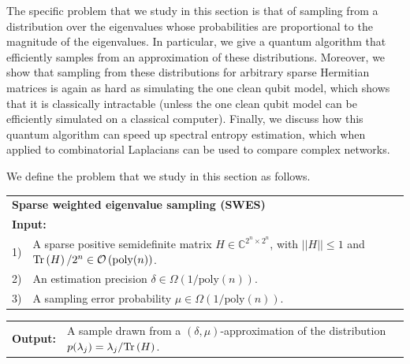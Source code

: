\documentclass[a4paper, onecolumn, accepted=2022-08-28]{quantumarticle}
\newcommand{\bigO}[1]{\mathcal{O}\left( #1 \right)}
\newcommand{\Tr}{\mbox{\rm Tr}}
\newcommand{\tr}[1]{\Tr\left(#1\right)}
\begin{document}
The specific problem that we study in this section is that of sampling from a distribution over the eigenvalues whose probabilities are proportional to the magnitude of the eigenvalues.
In particular, we give a quantum algorithm that efficiently samples from an approximation of these distributions.
Moreover, we show that sampling from these distributions for arbitrary sparse Hermitian matrices is again as hard as simulating the one clean qubit model, which shows that it is classically intractable (unless the one clean qubit model can be efficiently simulated on a classical computer).
Finally, we discuss how this quantum algorithm can speed up spectral entropy estimation, which when applied to combinatorial Laplacians can be used to compare complex networks.

We define the problem that we study in this section as follows.

\vspace{5pt}
\noindent\begin{tabularx}{\linewidth}{l X c}
  \multicolumn{2}{l}{\textbf{\textsf{Sparse weighted eigenvalue sampling (SWES)}}} \\
  \multicolumn{2}{l}{\textbf{Input:}}\\
  1) & A sparse positive semidefinite matrix $H \in \mathbb{C}^{2^n \times 2^n}$, with $||H|| \leq 1$  and $\tr{H}/2^n \in \bigO{\mathrm{poly}(n)}$.\\
  2) & An estimation precision $\delta \in \Omega\left(1/\mathrm{poly}(n)\right)$.\\
  3) & A sampling error probability $\mu \in \Omega\left( 1/\mathrm{poly}(n)\right)$. \\
  \end{tabularx}
\noindent\begin{tabularx}{\linewidth}{l X c}
  \textbf{Output:} & A sample drawn from a $(\delta, \mu)$-approximation of the distribution $p(\lambda_j) = \lambda_j / \tr{H}$.
\end{tabularx}
\vspace{5pt}
\end{document}
